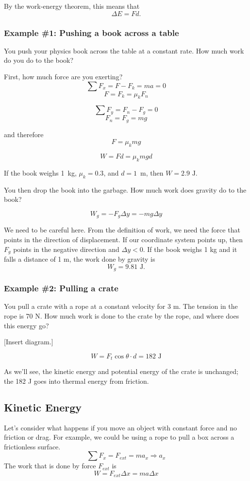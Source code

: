 By the work-energy theorem, this means that
$$\Delta E=Fd.$$

\subsubsection{Example \#1: Pushing a book across a table}
You push your physics book across the table at a constant rate. How much work do you do to the book?

First, how much force are you exerting?
$$\sum F_x = F - F_k = ma = 0$$
$$F = F_k = \mu_kF_n$$

$$\sum F_y = F_n - F_g = 0$$
$$F_n = F_g = mg$$

and therefore
$$F = \mu_kmg$$

$$W=Fd=\mu_kmgd$$

If the book weighs 1~kg, $\mu_k=0.3$, and $d=1$~m, then $\boxed{W=2.9\mbox{ J}}$.

You then drop the book into the garbage. How much work does gravity do to the book?

$$W_g=-F_g\Delta{y}=-mg\Delta{y}$$

We need to be careful here. From the definition of work, we need the force that points in the direction of displacement. If our coordinate system points up, then $F_g$ points in the negative direction and $\Delta{y}<0$. If the book weighs 1 kg and it falls a distance of 1 m, the work done by gravity is 
$$\boxed{W_g=9.81\mbox{ J}}.$$

\subsubsection{Example \#2: Pulling a crate}
You pull a crate with a rope at a constant velocity for 3 m. The tension in the rope is 70 N. How much work is done to the crate by the rope, and where does this energy go?

[Insert diagram.]
\vspace{5cm}

$$W=F_t\cos\theta\cdot{d}=182\mbox{ J}$$

As we'll see, the kinetic energy and potential energy of the crate is unchanged; the 182 J goes into thermal energy from friction.


\subsection{Kinetic Energy}
Let's consider what happens if you move an object with constant force and no friction or drag. For example, we could be using a rope to pull a box across a frictionless surface.
$$\sum F_x=F_{ext}=ma_x\Rightarrow a_x$$
The work that is done by force $F_{ext}$ is
$$W = F_{ext}\Delta x = ma\Delta x$$

